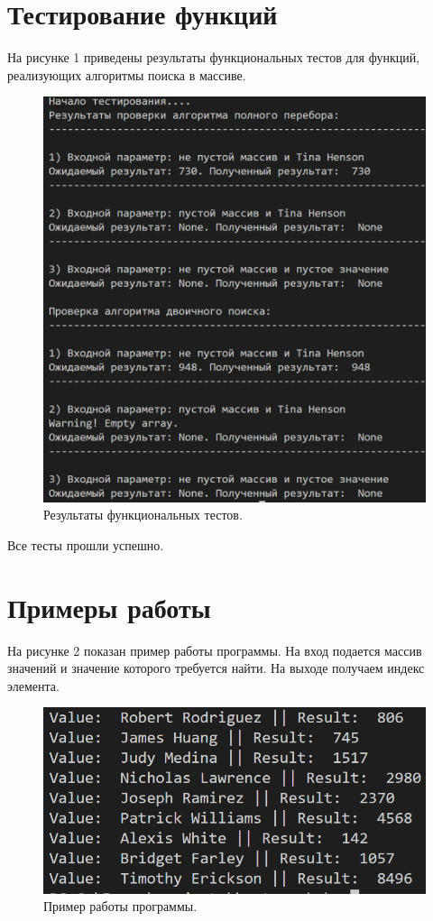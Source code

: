 \documentclass[a4paper, 12pt]{article}
\begin{document}
\section{Тестирование функций}
	\hspace*{5mm} На рисунке 1 приведены результаты функциональных тестов для функций, реализующих алгоритмы поиска в массиве.
	\clearpage
	\newpage
	\begin{figure}[h]
		\centering \includegraphics[scale=0.9]{tests}
		\centering\caption{Результаты функциональных тестов.}
	\end{figure}
	Все тесты прошли успешно.	 	


\section{Примеры работы}

	\hspace*{5mm} На рисунке 2 показан пример работы программы. На вход подается массив значений и значение которого требуется найти. На выходе получаем индекс элемента. 
	\clearpage
	\newpage
	\begin{figure}[h]
		\centering \includegraphics[scale=1.4]{res}
		\centering\caption{Пример работы программы.}
	\end{figure}
\end{document}
